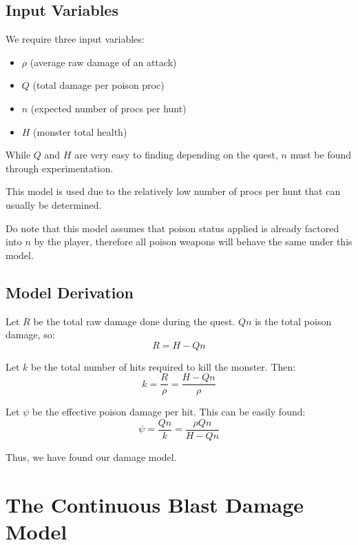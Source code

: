 \documentclass{article}
\begin{document}
\subsection{Input Variables}%
\label{sub:poison_input_variables}

We require three input variables:
\begin{itemize}
    \item $\rho$ (average raw damage of an attack)
    \item $Q$ (total damage per poison proc)
    \item $n$ (expected number of procs per hunt)
    \item $H$ (monster total health)
\end{itemize}

While $Q$ and $H$ are very easy to finding depending on the quest, $n$ must be found through experimentation.

This model is used due to the relatively low number of procs per hunt that can usually be determined.

Do note that this model assumes that poison status applied is already factored into $n$ by the player, therefore all poison weapons will behave the same under this model.


\subsection{Model Derivation}%
\label{sub:simplified_poison_model_derivation}

Let $R$ be the total raw damage done during the quest. $Q n$ is the total poison damage, so:
\begin{equation}
    R = H - Q n
\end{equation}

Let $k$ be the total number of hits required to kill the monster. Then:
\begin{equation}
    k = \frac{R}{\rho} = \frac{H - Q n}{\rho} 
\end{equation}

Let $\psi$ be the effective poison damage per hit. This can be easily found:
\begin{equation}
    \psi = \frac{Q n}{k} = \frac{\rho Q n}{H - Q n} 
\end{equation}

Thus, we have found our damage model.


\newpage


\section{The Continuous Blast Damage Model}%
\label{sec:the_continuous_blast_damage_model}
\end{document}
